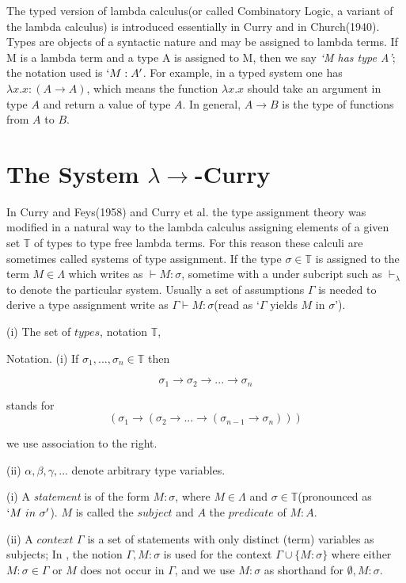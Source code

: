 The typed version of lambda calculus(or called Combinatory Logic, a variant of the lambda calculus) is introduced essentially in Curry\cite{curry1934functionality} and in Church(1940). Types are objects of a syntactic nature and may be assigned to lambda terms. If M is a lambda term and a type A is assigned to M, then we say \textit{`M has type A'}; the notation used is $`M:A'$. For example, in a typed system one has $\lambda x.x : (A \rightarrow A)$, which means the function $\lambda x.x$ should take an argument in type $A$ and return a value of type $A$. In general, $A \rightarrow B$ is the type of functions from $A$ to $B$.

\section{The System $\lambda \rightarrow $-Curry}

In Curry and Feys(1958) and Curry et al. the type assignment theory was modified in a natural way to the lambda calculus assigning elements of a given set $\mathbb{T}$ of types to type free lambda terms. For this reason these calculi are sometimes called systems of type assignment. If the type $\sigma \in \mathbb{T}$ is assigned to the term $M \in \Lambda$ which writes as $\vdash M : \sigma$, sometime with a under subcript such as $\vdash _\lambda$ to denote the particular system. Usually a set of assumptions $\Gamma$ is needed to derive a type assignment write as $\Gamma \vdash M : \sigma$(read as `$\Gamma$ yields $M$ in $\sigma$').

\begin{def1}
\normalfont (i) The set of $types$, notation $\mathbb{T}$, 
\end{def1} 

Notation. (i) If $\sigma _1,...,\sigma _n \in \mathbb{T}$ then

\begin{equation*}
\sigma _1 \rightarrow \sigma _2 \rightarrow ... \rightarrow \sigma _n
\end{equation*}

stands for
\begin{equation*}
(\sigma _1 \rightarrow (\sigma _2 \rightarrow ... \rightarrow (\sigma _{n-1} \rightarrow \sigma _n)))
\end{equation*}

we use association to the right.

(ii) $\alpha,\beta,\gamma,...$ denote arbitrary type variables.


\begin{def1}
\normalfont (i) A \textit{statement} is of the form $M : \sigma$, where $M\in \Lambda$ and $\sigma \in \mathbb{T}$(pronounced as $`M\ in\ \sigma'$). $M$ is called the $subject$ and $A$ the $predicate$ of $M : A$.  
\end{def1}
(ii) A $context$ $\Gamma$ is a set of statements with only distinct (term) variables as subjects; In \cite{svb2001type}, the notion $\Gamma,M:\sigma$ is used for the context $\Gamma \cup \{M:\sigma\}$ where either $M:\sigma \in \Gamma$ or $M$ does not occur in $\Gamma$, and we use $M:\sigma$ as shorthand for $\emptyset,M:\sigma$.


